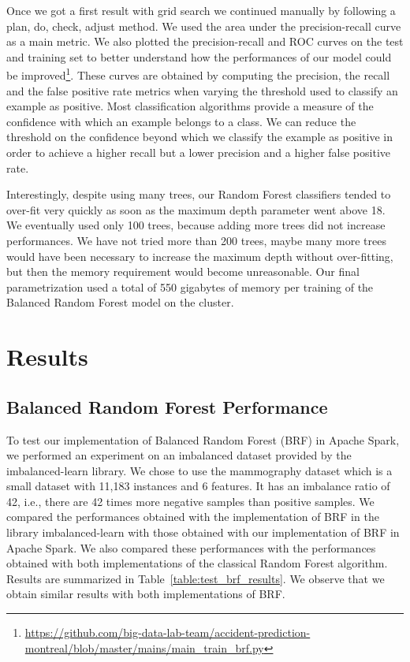 \documentclass[conference]{IEEEtran}
\begin{document}
Once we got a first result with grid search we continued manually by
following a plan, do, check, adjust method. We used the area under the precision-recall curve as a main metric. We also plotted the precision-recall and ROC curves on the test and training set to better understand how the performances of our model could be improved\footnote{\url{https://github.com/big-data-lab-team/accident-prediction-montreal/blob/master/mains/main\_train\_brf.py}}. These curves are obtained by computing the precision, the recall and the false positive rate metrics when varying the threshold used to classify an example as positive. Most classification algorithms provide a measure of the confidence with which an example belongs to a class. We can reduce the threshold on the confidence beyond which we classify the example as positive in order to achieve a higher recall but a lower precision and a higher false positive rate.

Interestingly, despite using many trees, our Random Forest classifiers
tended to over-fit very quickly as soon as the maximum depth parameter went
above 18. We eventually used only 100 trees, because adding more trees did
not increase performances. We have not tried more than 200 trees, maybe
many more trees would have been necessary to increase the maximum depth
without over-fitting, but then the memory requirement would become unreasonable.
Our final parametrization used a total of 550 gigabytes of memory per training of the Balanced Random Forest model on the cluster.


\section{Results}
\label{sec:results}


\subsection{Balanced Random Forest Performance}

To test our implementation of Balanced Random Forest (BRF) in Apache Spark, we performed an experiment on an imbalanced dataset provided by the imbalanced-learn library.
We chose to use the mammography dataset\cite{Woods1993} which is a small dataset with 11,183 instances and 6 features. It has an imbalance ratio of 42, i.e., there are 42 times more negative samples than positive samples. We compared the performances obtained with the implementation of BRF in the library imbalanced-learn with those obtained with our implementation of BRF in Apache Spark. We also compared these performances with the performances obtained with both implementations of the classical Random Forest algorithm.
Results are summarized in Table~\ref{table:test_brf_results}. We observe that we obtain similar results with both implementations of BRF.
\end{document}
